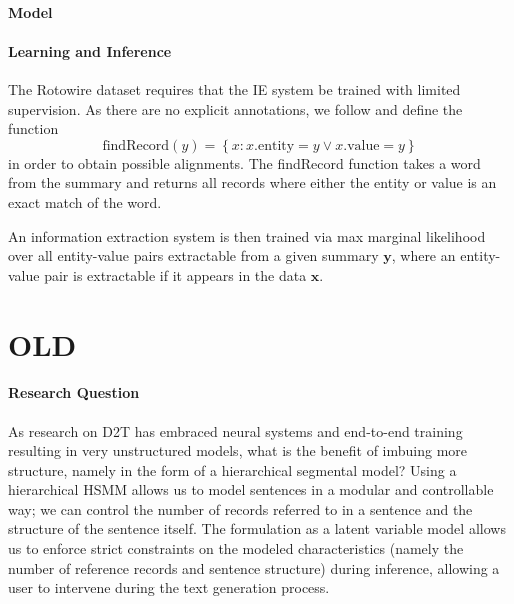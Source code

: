 \documentclass[11pt]{article}
\newcommand\set[1]{\left\{#1\right\}}
\newcommand{\bx}{\mathbf{x}}
\newcommand{\by}{\mathbf{y}}
\begin{document}
\paragraph{Model}

\paragraph{Learning and Inference}
The Rotowire dataset requires that the IE system be trained with limited supervision.
As there are no explicit annotations, we follow \citep{wiseman2017d2t} and define the function
\begin{equation}
\text{findRecord}(y) = \set{ x : x.\text{entity} = y \vee x.\text{value} = y}
\end{equation}
in order to obtain possible alignments.
The findRecord function takes a word from the summary and returns all records where
either the entity or value is an exact match of the word.

An information extraction system is then trained via max marginal likelihood over
all entity-value pairs extractable from a given summary $\by$,
where an entity-value pair is extractable if it appears in the data $\bx$.

\section{OLD}

\paragraph{Research Question}
As research on D2T has embraced neural systems and end-to-end training resulting
in very unstructured models, what is the benefit of imbuing more structure, namely in the
form of a hierarchical segmental model?
Using a hierarchical HSMM allows us to model
sentences in a modular and controllable way;
we can control the number of records referred to in a sentence and 
the structure of the sentence itself.
The formulation as a latent variable model allows us to enforce strict constraints on
the modeled characteristics (namely the number of reference records and sentence structure)
during inference, allowing a user to intervene during the text generation process.
\end{document}
